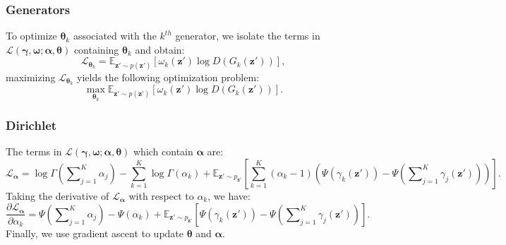 \documentclass{article}
\begin{document}
\subsubsection{Generators}
\label{App:Generators}

To optimize $\bm{\theta}_k$ associated with the $k^{th}$ generator, we isolate the terms in $\mathcal{L}\left( \bm{\gamma},\bm{\omega}; \bm{\alpha},\bm{\theta}\right)$ containing $\bm{\theta}_k$ and obtain:
\begin{equation}
\label{eq:Appendix19}
\mathcal{L}_{\bm{\theta}_k}
=
\mathbb{E}_{\mathbf{z}' \sim p\left(\mathbf{z}'\right)}
\left[
\omega_k\left( \mathbf{z}' \right)
\log D\left( G_k\left( \mathbf{z}'\right) \right)
\right],
\end{equation}
maximizing $\mathcal{L}_{\bm{\theta}_k}$ yields the following optimization problem:
\begin{equation}
\label{eq:Appendix20}
\max_{\bm{\theta}_k}
\mathbb{E}_{\mathbf{z}' \sim p \left( \mathbf{z}' \right)}
\left[
\omega_k\left( \mathbf{z}' \right)
\log D\left( G_k\left( \mathbf{z}' \right) \right)
\right].
\end{equation}
\subsubsection{Dirichlet}
\label{App:Dirichlet}

The terms in $\mathcal{L}\left( \bm{\gamma},\bm{\omega}; \bm{\alpha},\bm{\theta}\right)$ which contain $\bm{\alpha}$ are:
\begin{equation}
\label{eq:Appendix21}
\mathcal{L}_{\bm{\alpha}}
=
\log \Gamma \left( \sum\nolimits_{j=1}^K \alpha_j \right)
-\sum_{k=1}^K \log \Gamma \left( \alpha_k \right)
+
\mathbb{E}_{\mathbf{z}' \sim p_{\mathbf{z}'}}
\left[
\sum_{k=1}^K
\left( \alpha_k-1 \right)
\left( \Psi\left(\gamma_k\left(\mathbf{z}'\right)\right)
-\Psi\left(\sum\nolimits_{j=1}^K\gamma_j\left(\mathbf{z}'\right)\right) \right)
\right].
\end{equation}
Taking the derivative of $\mathcal{L}_{\bm{\alpha}}$ with respect to $\alpha_k$, we have:
\begin{equation}
\label{eq:Appendix22}
\frac{\partial \mathcal{L}_{\bm{\alpha}}}
{\partial \alpha_k}
=
\Psi\left(\sum\nolimits_{j=1}^K\alpha_j\right)-\Psi\left(\alpha_k\right)
+
\mathbb{E}_{\mathbf{z}' \sim p_{\mathbf{z}'}}
\left[
\Psi\left( \gamma_k\left( \mathbf{z}' \right) \right)
-\Psi\left( \sum\nolimits_{j=1}^K \gamma_j\left( \mathbf{z}' \right) \right)
\right].
\end{equation}
Finally, we use gradient ascent to update $\bm{\theta}$ and $\bm{\alpha}$.
\end{document}
